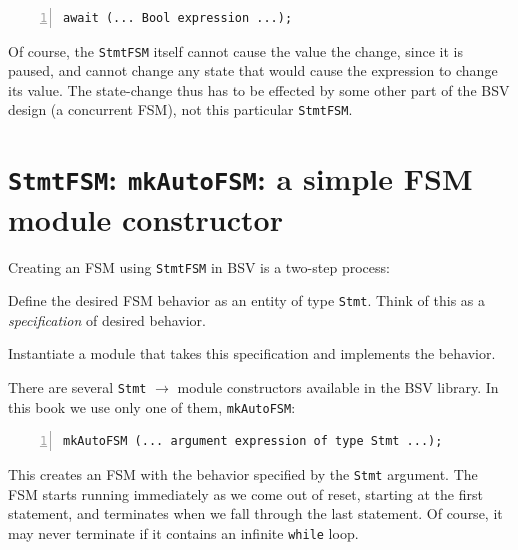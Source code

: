 {\small
\begin{Verbatim}[frame=single, numbers=left]
   await (... Bool expression ...);
\end{Verbatim}
}

Of course, the \verb|StmtFSM| itself cannot cause the value the
change, since it is paused, and cannot change any state that would
cause the expression to change its value.  The state-change thus has
to be effected by some other part of the BSV design (a concurrent
FSM), not this particular \verb|StmtFSM|.


\section{{\tt StmtFSM}: {\tt mkAutoFSM}: a simple FSM module constructor}

\label{Sec_AutoFSM}


Creating an FSM using \verb|StmtFSM| in BSV is a two-step process:

\begin{tightlist}

 \item Define the desired FSM behavior as an entity of type
       \verb|Stmt|.  Think of this as a \emph{specification} of
       desired behavior.

 \item Instantiate a module that takes this specification and
       implements the behavior.

\end{tightlist}

There are several \verb|Stmt| $\longrightarrow$ module constructors
available in the BSV library.  In this book we use only one of them,
\verb|mkAutoFSM|:

{\small
\begin{Verbatim}[frame=single, numbers=left]
   mkAutoFSM (... argument expression of type Stmt ...);
\end{Verbatim}
}

This creates an FSM with the behavior specified by the \verb|Stmt|
argument.  The FSM starts running immediately as we come out of reset,
starting at the first statement, and terminates when we fall through
the last statement.  Of course, it may never terminate if it contains
an infinite {\tt while} loop.

